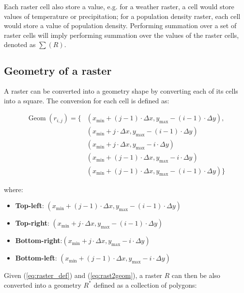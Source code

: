 \documentclass{article}
\begin{document}
Each raster cell also store a value, e.g. for a weather raster, a cell would store values of temperature or precipitation; for a population density raster, each cell would store a value of population density. Performing summation over a set of raster cells will imply performing summation over the values of the raster cells, denoted as $\sum(R)$.

\subsection{Geometry of a raster}

A raster can be converted into a geometry shape by converting each of its cells into a square. The conversion for each cell is defined as:

\begin{equation} \label{eq:rast2geom}
    \begin{split}
        \operatorname{Geom}(r_{i,j}) = \{
            &(x_{\text{min}}+(j-1)\cdot\Delta{x}, y_{\text{max}}-(i-1)\cdot\Delta{y}),\\
            &(x_{\text{min}}+j\cdot\Delta{x}, y_{\text{max}}-(i-1)\cdot\Delta{y})\\
            &(x_{\text{min}}+j\cdot\Delta{x}, y_{\text{max}}-i\cdot\Delta{y})\\
            &(x_{\text{min}}+(j-1)\cdot\Delta{x}, y_{\text{max}}-i\cdot\Delta{y})\\
            &(x_{\text{min}}+(j-1)\cdot\Delta{x}, y_{\text{max}}-(i-1)\cdot\Delta{y})
        \}
    \end{split}
\end{equation}

where:
\begin{itemize}
    \item \textbf{Top-left}: $(x_{\text{min}}+(j-1)\cdot\Delta{x}, y_{\text{max}}-(i-1)\cdot\Delta{y})$
    \item \textbf{Top-right}: $(x_{\text{min}}+j\cdot\Delta{x}, y_{\text{max}}-(i-1)\cdot\Delta{y})$
    \item \textbf{Bottom-right}:$(x_{\text{min}}+j\cdot\Delta{x}, y_{\text{max}}-i\cdot\Delta{y})$
    \item \textbf{Bottom-left}: $(x_{\text{min}}+(j-1)\cdot\Delta{x}, y_{\text{max}}-i\cdot\Delta{y})$
\end{itemize}

Given (\ref{eq:raster_def}) and (\ref{eq:rast2geom}), a raster $R$ can then be also converted into a geometry $R^*$ defined as a collection of polygons:
\end{document}
